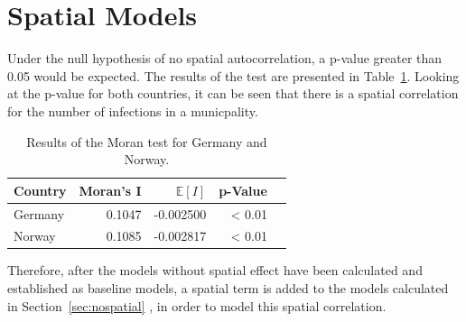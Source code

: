 \section{Spatial Models}\label{ch:spatial}
Under the null hypothesis of no spatial autocorrelation, a p-value greater than 0.05 would be expected. The results of the test are presented in Table~\ref{moranTest}. Looking at the p-value for both countries, it can be seen that there is a spatial correlation for the number of infections in a municpality.
\begin{table}[H] 
\caption{Results of the Moran test for Germany and Norway. \label{moranTest}}
\begin{tabular}{l r r r r}
\toprule
\textbf{Country} & \textbf{Moran's I}	& \textbf{$\mathbb{E}\left[I\right]$}	& \textbf{p-Value} \\
\midrule
Germany & 0.1047 & -0.002500 & < 0.01 \\
Norway & 0.1085 & -0.002817 & < 0.01 \\
\bottomrule
\end{tabular}
\end{table}
Therefore, after the models without spatial effect have been calculated and established as baseline models, a spatial term is added to the models calculated in Section~\ref{sec:nospatial} , in order to model this spatial correlation.
